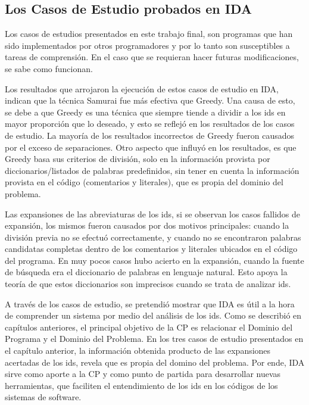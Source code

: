 \subsection{Los Casos de Estudio probados en IDA}

Los casos de estudios presentados en este trabajo final, son programas que han sido implementados por otros programadores y por lo tanto son susceptibles a tareas de comprensión. En el caso que se requieran hacer futuras modificaciones, se sabe como funcionan.

Los resultados que arrojaron la ejecución de estos casos de estudio en IDA, indican que la técnica Samurai fue más efectiva que Greedy. Una causa de esto, se debe a que Greedy es una técnica que siempre tiende a dividir a los ids en mayor proporción que lo deseado, y esto se reflejó en los resultados de los casos de estudio. La mayoría de los resultados incorrectos de Greedy fueron causados por el exceso de separaciones. Otro aspecto que influyó en los resultados, es que Greedy basa sus criterios de división, solo en la información provista por diccionarios/listados de palabras predefinidos, sin tener en cuenta la información provista en el código (comentarios y literales), que es propia del dominio del problema.

Las expansiones de las abreviaturas de los ids, si se observan los casos fallidos de expansión, los mismos fueron causados por dos motivos principales: cuando la división previa no se efectuó correctamente, y cuando no se encontraron palabras candidatas completas dentro de los comentarios y literales ubicados en el código del programa. En muy pocos casos hubo acierto en la expansión, cuando la fuente de búsqueda era el diccionario de palabras en lenguaje natural. Esto apoya la teoría de que estos diccionarios son imprecisos cuando se trata de analizar ids.

A través de los casos de estudio, se pretendió mostrar que IDA es útil a la hora de comprender un sistema por medio del análisis de los ids. Como se describió en capítulos anteriores, el principal objetivo de la CP es relacionar el Dominio del Programa y el Dominio del Problema. En los tres casos de estudio presentados en el capítulo anterior, la información obtenida producto de las expansiones acertadas de los ids, revela que es propia del domino del problema. Por ende, IDA sirve como aporte a la CP y como punto de partida para desarrollar nuevas herramientas, que faciliten el entendimiento de los ids en los códigos de los sistemas de software.


